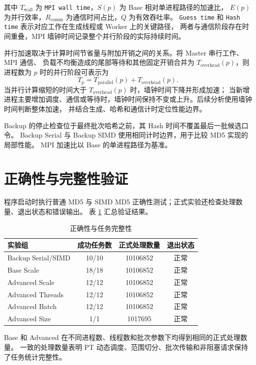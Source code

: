 \documentclass[UTF8,a4paper,12pt]{ctexart}
\newcommand{\code}[1]{\texttt{#1}}
\begin{document}
其中 $T_{\mathrm{wall}}$ 为 \code{MPI wall time}，$S(p)$ 为 Base 相对单进程路径的加速比，
$E(p)$ 为并行效率，$R_{\mathrm{comm}}$ 为通信时间占比，$Q$ 为有效吞吐率。
\code{Guess time} 和 \code{Hash time} 表示对应工作在生成线程或 Worker 上的关键路径，
两者与通信阶段存在时间重叠，MPI 墙钟时间记录整个并行阶段的实际持续时间。

并行加速取决于计算时间节省量与附加开销之间的关系。将 Master 串行工作、MPI 通信、
负载不均衡造成的尾部等待和其他固定开销合并为 $T_{\mathrm{overhead}}(p)$，则进程数为 $p$
时的并行阶段可表示为
\[
T_p = T_{\mathrm{parallel}}(p) + T_{\mathrm{overhead}}(p).
\]
当并行计算缩短的时间大于 $T_{\mathrm{overhead}}(p)$ 时，墙钟时间下降并形成加速；
当新增进程主要增加调度、通信或等待时，墙钟时间保持不变或上升。后续分析使用墙钟时间判断整体加速，
并结合生成、哈希和通信计时定位性能边界。

Backup 的停止检查位于最终批次哈希之前，其 Hash 时间不覆盖最后一批候选口令。
Backup Serial 与 Backup SIMD 使用相同计时边界，用于比较 MD5 实现的局部性能。
MPI 加速比以 Base 的单进程路径为基准。

\section{正确性与完整性验证}

程序启动时执行普通 MD5 与 SIMD MD5 正确性测试；正式实验还检查处理数量、退出状态和错误输出。
表 \ref{tab:correctness} 汇总验证结果。

\begin{table}[H]
  \centering
  \caption{正确性与任务完整性}
  \label{tab:correctness}
  \begin{tabular}{lccc}
    \toprule
    实验组 & 成功任务数 & 正式处理数量 & 退出状态 \\
    \midrule
    Backup Serial/SIMD & 10/10 & 10106852 & 正常 \\
    Base Scale & 18/18 & 10106852 & 正常 \\
    Advanced Scale & 12/12 & 10106852 & 正常 \\
    Advanced Threads & 12/12 & 10106852 & 正常 \\
    Advanced Batch & 12/12 & 10106852 & 正常 \\
    Advanced Size & 1/1 & 1017695 & 正常 \\
    \bottomrule
  \end{tabular}
\end{table}

Base 和 Advanced 在不同进程数、线程数和批次参数下均得到相同的正式处理数量。
一致的处理数量表明 PT 动态调度、范围切分、批次传输和非阻塞请求保持了任务统计完整性。
\end{document}
